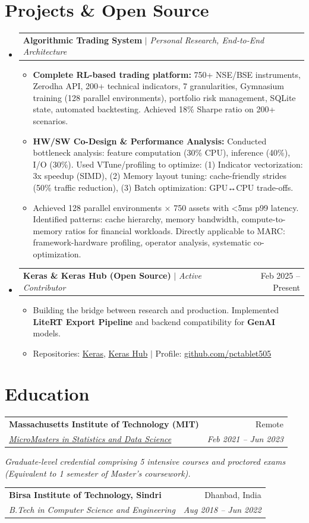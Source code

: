 \documentclass[10pt, letterpaper]{article}
\makeatletter
\newcommand{\resumeItem}[1]{
  \item\small{
    {#1 \vspace{-2pt}}
  }
}
\newcommand{\resumeSubheading}[4]{
  \vspace{-1pt}\item
    \begin{tabular*}{0.98\textwidth}[t]{l@{\extracolsep{\fill}}r}
      \textbf{#1} & {\small\color{darkgray} #2} \\
      \textit{\small#3} & \textit{\small\color{darkgray} #4} \\
    \end{tabular*}\vspace{-7pt}
}
\newcommand{\resumeProjectHeading}[2]{
    \item
    \begin{tabular*}{0.98\textwidth}{l@{\extracolsep{\fill}}r}
      \small#1 & #2 \\
    \end{tabular*}\vspace{-7pt}
}
\newcommand{\resumeSubHeadingListStart}{\begin{itemize}[leftmargin=0.15in, label={}]}
\newcommand{\resumeSubHeadingListEnd}{\end{itemize}}
\newcommand{\resumeItemListStart}{\begin{itemize}}
\newcommand{\resumeItemListEnd}{\end{itemize}\vspace{-5pt}}
\makeatother
\begin{document}
\section{Projects \& Open Source}
  \resumeSubHeadingListStart
    \resumeProjectHeading
      {\textbf{Algorithmic Trading System} $|$ \emph{Personal Research, End-to-End Architecture}}{}
      \resumeItemListStart
        \resumeItem{\textbf{Complete RL-based trading platform:} 750+ NSE/BSE instruments, Zerodha API, 200+ technical indicators, 7 granularities, Gymnasium training (128 parallel environments), portfolio risk management, SQLite state, automated backtesting. Achieved 18\% Sharpe ratio on 200+ scenarios.}
        \resumeItem{\textbf{HW/SW Co-Design \& Performance Analysis:} Conducted bottleneck analysis: feature computation (30\% CPU), inference (40\%), I/O (30\%). Used VTune/profiling to optimize: (1) Indicator vectorization: 3x speedup (SIMD), (2) Memory layout tuning: cache-friendly strides (50\% traffic reduction), (3) Batch optimization: GPU↔CPU trade-offs.}
        \resumeItem{Achieved 128 parallel environments × 750 assets with <5ms p99 latency. Identified patterns: cache hierarchy, memory bandwidth, compute-to-memory ratios for financial workloads. Directly applicable to MARC: framework-hardware profiling, operator analysis, systematic co-optimization.}
      \resumeItemListEnd

    \resumeProjectHeading
      {\textbf{Keras \& Keras Hub (Open Source)} $|$ \emph{Active Contributor}}{Feb 2025 -- Present}
      \resumeItemListStart
        \resumeItem{Building the bridge between research and production. Implemented \textbf{LiteRT Export Pipeline} and backend compatibility for \textbf{GenAI} models.}
        \resumeItem{Repositories: \href{https://github.com/keras-team/keras}{Keras}, \href{https://github.com/keras-team/keras-hub}{Keras Hub} $|$ Profile: \href{https://github.com/pctablet505}{\color{midnightblue}github.com/pctablet505}}
      \resumeItemListEnd
      
  \resumeSubHeadingListEnd

\section{Education}
  \resumeSubHeadingListStart
    \resumeSubheading
      {Massachusetts Institute of Technology (MIT)}{Remote}
      {\href{https://micromasters.mit.edu/ds}{MicroMasters in Statistics and Data Science}}{Feb 2021 -- Jun 2023}
      \vspace{-4pt}
      \small{\item{\textit{Graduate-level credential comprising 5 intensive courses and proctored exams (Equivalent to 1 semester of Master's coursework).}}}
    \resumeSubheading
      {Birsa Institute of Technology, Sindri}{Dhanbad, India}
      {B.Tech in Computer Science and Engineering}{Aug 2018 -- Jun 2022}
  \resumeSubHeadingListEnd
\end{document}

